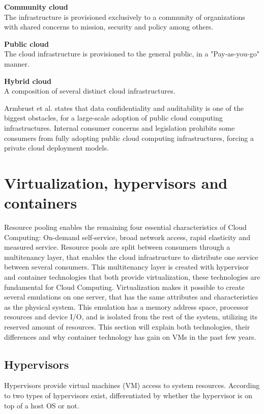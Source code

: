 \textbf{Community cloud}\\
The infrastructure is provisioned exclusively to a community of organizations with shared concerns to mission, security and policy among others.

\textbf{Public cloud}\\
The cloud infrastructure is provisioned to the general public, in a "Pay-as-you-go" manner.

\textbf{Hybrid cloud}\\
A composition of several distinct cloud infrastructures.


Armbrust et al.\cite{armbrust2010view} states that data confidentiality and auditability is one of the biggest obstacles, for a large-scale adoption of public cloud computing infrastructures. Internal consumer concerns and legislation prohibits some consumers from fully adopting public cloud computing infrastructures, forcing a private cloud deployment models. 


\section{Virtualization, hypervisors and containers}
Resource pooling enables the remaining four essential characteristics of Cloud Computing: On-demand self-service, broad network access, rapid elasticity and measured service\cite{bittman2009server}. Resource pools are split  between consumers through a multitenancy layer, that enables the cloud infrastructure to distribute one service between several consumers\cite{krebs2012architectural}. This multitenancy layer is created with hypervisor and container technologies that both provide virtualization, these technologies are fundamental for Cloud Computing. Virtualization makes it possible to create several emulations on one server, that has the same attributes and characteristics as the physical system. This emulation has a memory address space, processor resources and device I/O, and is isolated from the rest of the system, utilizing its reserved amount of resources. This section will explain both technologies, their differences and why container technology has gain on VMs in the past few years.

\subsection{Hypervisors}
Hypervisors provide virtual machines (VM) access to system resources. According to \cite[p.~100]{sosinsky2010cloud} two types of hypervisors exist, differentiated by whether the hypervisor is on top of a host OS or not.

